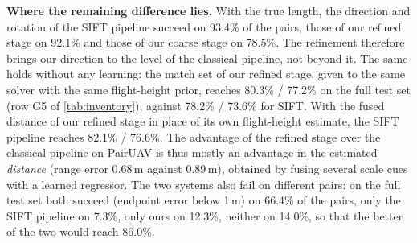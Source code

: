 \documentclass[10pt,twocolumn,letterpaper]{article}
\begin{document}
\noindent\textbf{Where the remaining difference lies.} With the true length, the direction and rotation of the SIFT pipeline succeed on 93.4\% of the pairs, those of our refined stage on 92.1\% and those of our coarse stage on 78.5\%. The refinement therefore brings our direction to the level of the classical pipeline, not beyond it. The same holds without any learning: the match set of our refined stage, given to the same solver with the same flight-height prior, reaches 80.3\% / 77.2\% on the full test set (row G5 of \cref{tab:inventory}), against 78.2\% / 73.6\% for SIFT. With the fused distance of our refined stage in place of its own flight-height estimate, the SIFT pipeline reaches 82.1\% / 76.6\%. The advantage of the refined stage over the classical pipeline on PairUAV is thus mostly an advantage in the estimated \emph{distance} (range error 0.68\,m against 0.89\,m), obtained by fusing several scale cues with a learned regressor. The two systems also fail on different pairs: on the full test set both succeed (endpoint error below 1\,m) on 66.4\% of the pairs, only the SIFT pipeline on 7.3\%, only ours on 12.3\%, neither on 14.0\%, so that the better of the two would reach 86.0\%.
\end{document}
